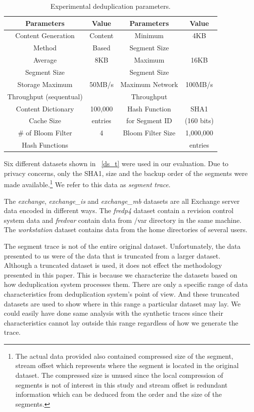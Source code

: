 \begin{table}[!t]
\centering
\begin{tabular}{c|c|| c| c}
\hline
\bfseries Parameters 	&\bfseries Value		&\bfseries Parameters 	&\bfseries Value		\\
\hline\hline
Content Generation	&Content			&Minimum 			&4KB				\\
Method			&Based			&Segment Size		&				\\
\hline
Average			&8KB				&Maximum			&16KB			\\
Segment Size		&				&Segment Size		&				\\
\hline
Storage Maximum	 	&50MB/s 			&Maximum Network	&100MB/s			\\
Throughput (sequentual)	& 				&Throughput		&				\\
\hline
Content Dictionary		&100,000			&Hash Function		&SHA1			\\
Cache Size			&entries			&for Segment ID		&(160 bits)			\\
\hline
\# of Bloom Filter 		&4				&Bloom Filter Size		&1,000,000			\\
Hash Functions 		&				&				&entries			\\
\hline
\end{tabular}
\captionsetup{format=myformat}
\caption{Experimental deduplication parameters.}
\label{ex_t}
\end{table}

Six different datasets shown in \tablename~\ref{ds_t} were used in our evaluation. Due to privacy concerns, only the SHA1, size and the backup order of the segments were made available.\footnote{The actual data provided also contained compressed size of the segment, stream offset which represents where the segment is located in the original dataset. The compressed size is unused since the local compression of segments is not of interest in this study and stream offset is redundant information which can be deduced from the order and the size of the segments.} We refer to this data as \emph{segment trace}. 

The \emph{exchange}, \emph{exchange\_is} and \emph{exchange\_mb} datasets are all Exchange server data encoded in different ways. The \emph{fredp4} dataset contain a revision control system data and \emph{fredvar} contain data from /var directory in the same machine. The \emph{workstation} dataset contains data from the home directories of several users.  

The segment trace is not of the entire original dataset. Unfortunately, the data presented to us were of the data that is truncated from a larger dataset. Although a truncated dataset is used, it does not effect the methodology presented in this paper. This is because we characterize the datasets based on how deduplication system processes them. There are only a specific range of data characteristics from deduplication system's point of view. And these truncated datasets are used to show where in this range a particular dataset may lay. We could easily have done same analysis with the synthetic traces since their characteristics cannot lay outside this range regardless of how we generate the trace. 

